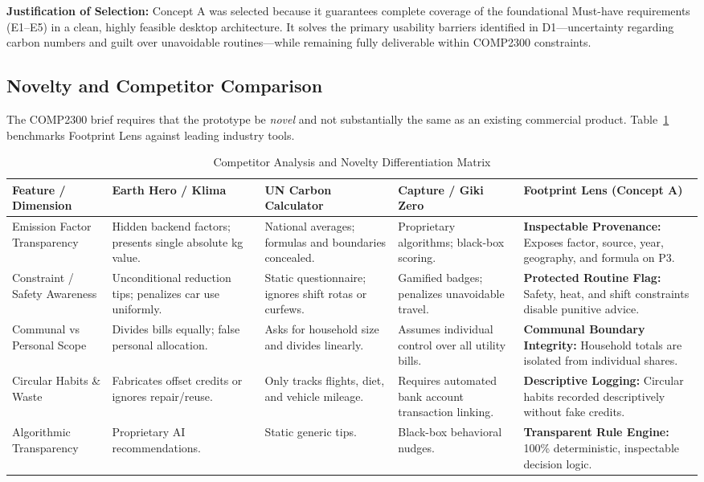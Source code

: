 \documentclass[12pt,a4paper]{article}
\begin{document}
\textbf{Justification of Selection:} Concept A was selected because it guarantees complete coverage of the foundational Must-have requirements (E1--E5) in a clean, highly feasible desktop architecture. It solves the primary usability barriers identified in D1—uncertainty regarding carbon numbers and guilt over unavoidable routines—while remaining fully deliverable within COMP2300 constraints.

\subsection{Novelty and Competitor Comparison}
The COMP2300 brief requires that the prototype be \emph{novel} and not substantially the same as an existing commercial product. Table~\ref{tab:competitor} benchmarks Footprint Lens against leading industry tools.

\begin{table}[ht]
\centering
\small
\caption{Competitor Analysis and Novelty Differentiation Matrix}
\label{tab:competitor}
\begin{tabularx}{\textwidth}{@{}lXXXX@{}}
\toprule
\textbf{Feature / Dimension} & \textbf{Earth Hero / Klima} & \textbf{UN Carbon Calculator} & \textbf{Capture / Giki Zero} & \textbf{Footprint Lens (Concept A)}\\
\midrule
Emission Factor Transparency & Hidden backend factors; presents single absolute kg value. & National averages; formulas and boundaries concealed. & Proprietary algorithms; black-box scoring. & \textbf{Inspectable Provenance:} Exposes factor, source, year, geography, and formula on P3.\\
Constraint / Safety Awareness & Unconditional reduction tips; penalizes car use uniformly. & Static questionnaire; ignores shift rotas or curfews. & Gamified badges; penalizes unavoidable travel. & \textbf{Protected Routine Flag:} Safety, heat, and shift constraints disable punitive advice.\\
Communal vs Personal Scope & Divides bills equally; false personal allocation. & Asks for household size and divides linearly. & Assumes individual control over all utility bills. & \textbf{Communal Boundary Integrity:} Household totals are isolated from individual shares.\\
Circular Habits \& Waste & Fabricates offset credits or ignores repair/reuse. & Only tracks flights, diet, and vehicle mileage. & Requires automated bank account transaction linking. & \textbf{Descriptive Logging:} Circular habits recorded descriptively without fake credits.\\
Algorithmic Transparency & Proprietary AI recommendations. & Static generic tips. & Black-box behavioral nudges. & \textbf{Transparent Rule Engine:} 100\% deterministic, inspectable decision logic.\\
\bottomrule
\end{tabularx}
\end{table}
\end{document}
